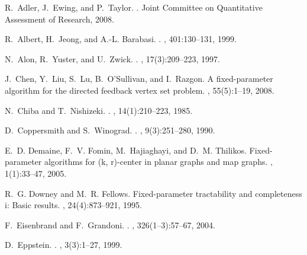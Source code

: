 \documentclass[11pt]{article}
\begin{document}

\begin{thebibliography}{10}

R.~Adler, J.~Ewing, and P.~Taylor.
.
\newblock Joint Committee on Quantitative Assessment of Research, 2008.

R.~Albert, H.~Jeong, and A.-L. Barabasi.
.
, 401:130{--}131, 1999.

N.~Alon, R.~Yuster, and U.~Zwick.
.
, 17(3):209{--}223, 1997.

J.~Chen, Y.~Liu, S.~Lu, B.~O'Sullivan, and I.~Razgon.
\newblock A fixed-parameter algorithm for the directed feedback vertex set
  problem.
, 55(5):1--19, 2008.

N.~Chiba and T.~Nishizeki.
.
, 14(1):210{--}223, 1985.

D.~Coppersmith and S.~Winograd.
.
, 9(3):251{--}280, 1990.

E.~D. Demaine, F.~V. Fomin, M.~Hajiaghayi, and D.~M. Thilikos.
\newblock Fixed-parameter algorithms for (k, r)-center in planar graphs and map
  graphs.
, 1(1):33--47, 2005.

R.~G. Downey and M.~R. Fellows.
\newblock Fixed-parameter tractability and completeness i: Basic results.
, 24(4):873--921, 1995.

F.~Eisenbrand and F.~Grandoni.
.
, 326(1{--}3):57{--}67, 2004.

D.~Eppstein.
.
, 3(3):1{--}27,
  1999.


\end{thebibliography}
\end{document}

